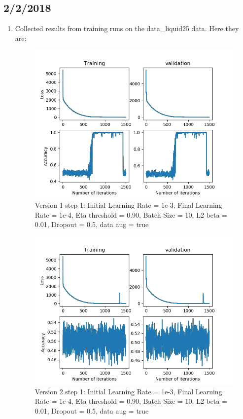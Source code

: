 \documentclass[12pt,reqno]{amsart}
\numberwithin{equation}{section}
\begin{document}
\subsection{2/2/2018}
\begin{enumerate}
\item Collected results from training runs on the data\_liquid25 data.  Here they are:

\begin{figure}[H]
\centering
\includegraphics[scale=0.6]{data_liquid25_version1_step1}
\caption{Version 1 step 1: Initial Learning Rate = 1e-3, Final Learning Rate = 1e-4, Eta threshold = 0.90, Batch Size = 10, L2 beta = 0.01, Dropout = 0.5, data aug = true}
\end{figure}

\begin{figure}[H]
\centering
\includegraphics[scale=0.6]{data_liquid25_version2_step1}
\caption{Version 2 step 1: Initial Learning Rate = 1e-3, Final Learning Rate = 1e-4, Eta threshold = 0.90, Batch Size = 10, L2 beta = 0.01, Dropout = 0.5, data aug = true}
\end{figure}


\end{enumerate}
\end{document}
